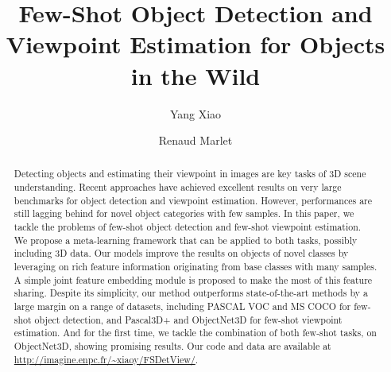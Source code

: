 \documentclass[runningheads]{llncs}
\begin{document}
\pagestyle{headings}
\mainmatter
\def\ECCVSubNumber{2712}  

\title{Few-Shot Object Detection and Viewpoint Estimation for Objects in the Wild}

\begin{comment}
\titlerunning{ECCV-20 submission ID \ECCVSubNumber} 
\authorrunning{ECCV-20 submission ID \ECCVSubNumber} 
\author{Anonymous ECCV submission}
\institute{Paper ID \ECCVSubNumber}
\end{comment}


\author{Yang Xiao
\and
Renaud Marlet
}
\maketitle


\begin{abstract}

Detecting objects and estimating their viewpoint in images are key tasks of 3D scene understanding. Recent approaches have achieved excellent results on very large benchmarks for object detection and viewpoint estimation. However, performances are still lagging behind for novel object categories with few samples. 
In this paper, we tackle the problems of few-shot object detection and few-shot viewpoint estimation. We propose a meta-learning framework that can be applied to both tasks, possibly including 3D data. 
Our models improve the results on objects of novel classes by leveraging on rich feature information originating from base classes with many samples.  
A simple joint feature embedding module is proposed to make the most of this feature sharing. 
Despite its simplicity, our method outperforms state-of-the-art methods by a large margin on a range of datasets, including PASCAL VOC and MS COCO for few-shot object detection, and Pascal3D+ and ObjectNet3D for few-shot viewpoint estimation. And for the first time, we tackle the combination of both few-shot tasks, on ObjectNet3D, showing promising results.
Our code and data are available at \url{http://imagine.enpc.fr/~xiaoy/FSDetView/}.





\end{abstract}
\end{document}

